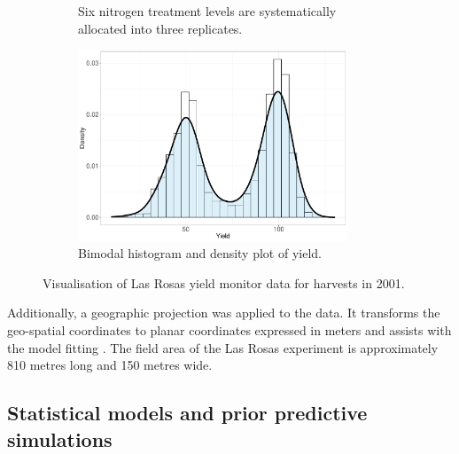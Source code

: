 \documentclass[a4paper]{article}   	%
\begin{document}
\begin{figure}[!htp]
\begin{subfigure}[t]{0.45\textwidth}
			\caption{Six nitrogen treatment levels are systematically allocated into three replicates.}\label{fig:lasrossatopo}
		\end{subfigure}
		\space
		\begin{subfigure}[t]{0.45\textwidth}
			\centering
			\includegraphics[height=5.7cm,width=\linewidth]{Images/lasrossa_view04}
			\caption{Bimodal histogram and density plot of yield.}\label{fig:lasrossahist}
		\end{subfigure}
		\caption{Visualisation of Las Rosas yield monitor data for harvests in 2001.}\label{fig:lasrossa}
	\end{figure}
	
	
	Additionally, a geographic projection was applied to the data. It transforms the geo-spatial coordinates to planar coordinates expressed in meters and assists with the model fitting \parencite{Rakshit2020Novel}. The field area of the Las Rosas experiment is approximately 810 metres long and 150 metres wide.
	
	
	
	\subsection{Statistical models and prior predictive simulations}
	
\end{document}
